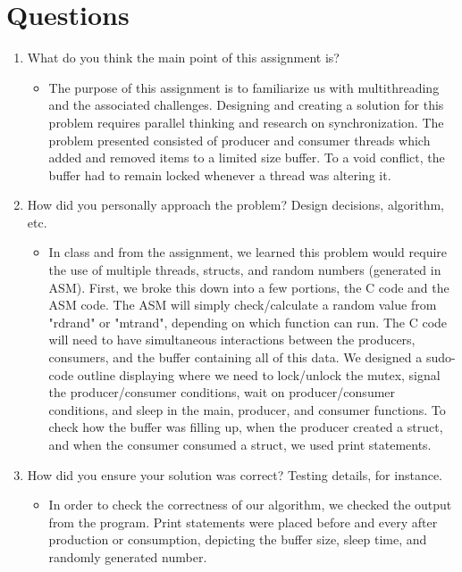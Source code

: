 \documentclass[letterpaper,10pt,onecolumn]{IEEEtran}
\begin{document}
    \vspace{7mm}
    
    \section*{Questions}
    \begin{enumerate}
        \item What do you think the main point of this assignment is?
        \begin{itemize}
            \item The purpose of this assignment is to familiarize us with multithreading and the associated challenges. Designing and creating a solution for this problem requires parallel thinking and research on synchronization. The problem presented consisted of producer and consumer threads which added and removed items to a limited size buffer. To a void conflict, the buffer had to remain locked whenever a thread was altering it.
        \end{itemize}
        \item How did you personally approach the problem? Design decisions, algorithm, etc.
        \begin{itemize}
            \item In class and from the assignment, we learned this problem would require the use of multiple threads, structs, and random numbers (generated in ASM). First, we broke this down into a few portions, the C code and the ASM code. The ASM will simply check/calculate a random value from "rdrand" or "mtrand", depending on which function can run. The C code will need to have simultaneous interactions between the producers, consumers, and the buffer containing all of this data. We designed a sudo-code outline displaying where we need to lock/unlock the mutex, signal the producer/consumer conditions, wait on producer/consumer conditions, and sleep in the main, producer, and consumer functions. To check how the buffer was filling up, when the producer created a struct, and when the consumer consumed a struct, we used print statements.
        \end{itemize}
        \item How did you ensure your solution was correct? Testing details, for instance.
        \begin{itemize}
            \item In order to check the correctness of our algorithm, we checked the output from the program. Print statements were placed before and every after production or consumption, depicting the buffer size, sleep time, and randomly generated number.

\end{itemize}
\end{enumerate}
\end{document}
